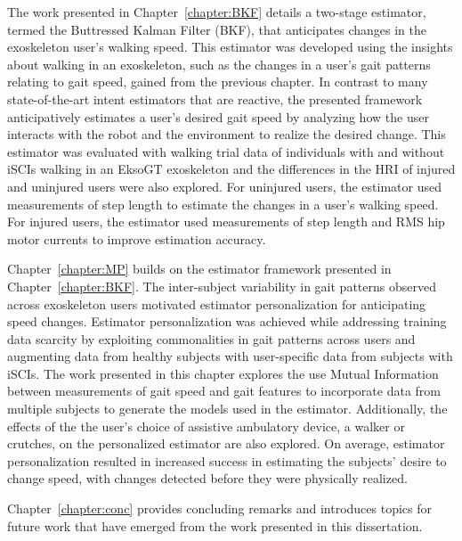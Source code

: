 The work presented in Chapter~\ref{chapter:BKF} details a two-stage estimator, termed the Buttressed Kalman Filter (BKF), that anticipates changes in the exoskeleton user’s walking speed. This estimator was developed using the insights about walking in an exoskeleton, such as the changes in a user's gait patterns relating to gait speed, gained from the previous chapter. In contrast to many state-of-the-art intent estimators that are reactive, the presented framework anticipatively estimates a user's desired gait speed by analyzing how the user interacts with the robot and the environment to realize the desired change. This estimator was evaluated with walking trial data of individuals with and without iSCIs walking in an EksoGT exoskeleton and the differences in the HRI of injured and uninjured users were also explored. For uninjured users, the estimator used measurements of step length to estimate the changes in a user's walking speed. For injured users, the estimator used measurements of step length and RMS hip motor currents to improve estimation accuracy.

Chapter~\ref{chapter:MP} builds on the estimator framework presented in Chapter~\ref{chapter:BKF}. The inter-subject variability in gait patterns observed across exoskeleton users motivated estimator personalization for anticipating speed changes. Estimator personalization was achieved while addressing training data scarcity by exploiting commonalities in gait patterns across users and augmenting data from healthy subjects with user-specific data from subjects with iSCIs. The work presented in this chapter explores the use Mutual Information between measurements of gait speed and gait features to incorporate data from multiple subjects to generate the models used in the estimator. Additionally, the effects of the the user's choice of assistive ambulatory device, a walker or crutches, on the personalized estimator are also explored. On average, estimator personalization resulted in increased success in estimating the subjects' desire to change speed, with changes detected before they were physically realized.

Chapter~\ref{chapter:conc} provides concluding remarks and introduces topics for future work that have emerged from the work presented in this dissertation.

